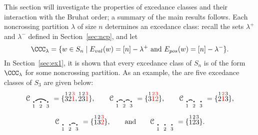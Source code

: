 \documentclass[12pt]{article}
\theoremstyle{definition}
\theoremstyle{remark}
\numberwithin{equation}{section}
\renewcommand{\setminus}{-}
\newcommand{\EP}{E_{pos}}
\newcommand{\EV}{E_{val}}
\begin{document}
This section will investigate the properties of excedance classes and their interaction with the Bruhat order; a summary of the main results follows.  Each noncrossing partition $\lambda$ of size $n$ determines an excedance class: recall the sets $\lambda^{+}$ and $\lambda^{-}$ defined in Section~\ref{sec:ncp}, and let
\[
\CCC_{\lambda} = \{ w \in S_{n} \;|\;  \text{$\EV(w) = [n] \setminus \lambda^{+}$ and $\EP(w) = [n] \setminus \lambda^{-}$}  \}.
\]
In Section~\ref{sec:ex1}, it is shown that every  excedance class of $S_{n}$ is of the form $\CCC_{\lambda}$ for some noncrossing partition.  As an example, the are five excedance classes of $S_{3}$ are given below:
\[
\mathcal{C}_{\begin{tikzpicture}[scale = 0.35, baseline = 0.35*-0.2]
\foreach \x in {1, ..., 3}{\draw[fill] (\x - 1, 0) circle (2pt) node[inner sep = 2pt] (\x) {};}
\foreach \x in {1, ..., 3}{\node[below] at (\x) {$\scriptstyle \x$};}
\foreach \i\j in {1/3}{\draw[thick] (\i) to[out = 35, in = 145] (\j);}
\end{tikzpicture}} = \{ \stackrel{1}{3}  \stackrel{2}{2} \color{red} \stackrel{3}{1} \color{black}, \stackrel{1}{2}\stackrel{2}{3} \color{red} \stackrel{3}{1} \color{black} \}, \qquad
\mathcal{C}_{\begin{tikzpicture}[scale = 0.35, baseline = 0.35*-0.2]
\foreach \x in {1, ..., 3}{\draw[fill] (\x - 1, 0) circle (2pt) node[inner sep = 2pt] (\x) {};}
\foreach \x in {1, ..., 3}{\node[below] at (\x) {$\scriptstyle \x$};}
\foreach \i\j in {1/2, 2/3}{\draw[thick] (\i) to[out = 35, in = 145] (\j);}
\end{tikzpicture}} = \{ \stackrel{1}{3} \color{red} \stackrel{2}{1} \stackrel{3}{2}  \color{black} \}, \qquad
\mathcal{C}_{\begin{tikzpicture}[scale = 0.35, baseline = 0.35*-0.2]
\foreach \x in {1, ..., 3}{\draw[fill] (\x - 1, 0) circle (2pt) node[inner sep = 2pt] (\x) {};}
\foreach \x in {1, ..., 3}{\node[below] at (\x) {$\scriptstyle \x$};}
\foreach \i\j in {1/2}{\draw[thick] (\i) to[out = 35, in = 145] (\j);}
\end{tikzpicture}} = \{\stackrel{1}{2}  \color{red} \stackrel{2}{1} \color{black}  \stackrel{3}{3}\}, 
\]
\[
\mathcal{C}_{\begin{tikzpicture}[scale = 0.35, baseline = 0.35*-0.2]
\foreach \x in {1, ..., 3}{\draw[fill] (\x - 1, 0) circle (2pt) node[inner sep = 2pt] (\x) {};}
\foreach \x in {1, ..., 3}{\node[below] at (\x) {$\scriptstyle \x$};}
\foreach \i\j in {2/3}{\draw[thick] (\i) to[out = 35, in = 145] (\j);}
\end{tikzpicture}} = \{\stackrel{1}{1} \stackrel{2}{3}  \color{red} \stackrel{3}{2} \color{black} \}, \qquad\text{and}\qquad
\mathcal{C}_{\begin{tikzpicture}[scale = 0.35, baseline = 0.35*-0.2]
\foreach \x in {1, ..., 3}{\draw[fill] (\x - 1, 0) circle (2pt) node[inner sep = 2pt] (\x) {};}
\foreach \x in {1, ..., 3}{\node[below] at (\x) {$\scriptstyle \x$};}
\end{tikzpicture}} = \{\stackrel{1}{1} \stackrel{2}{2} \stackrel{3}{3} \}.
\]
\end{document}
